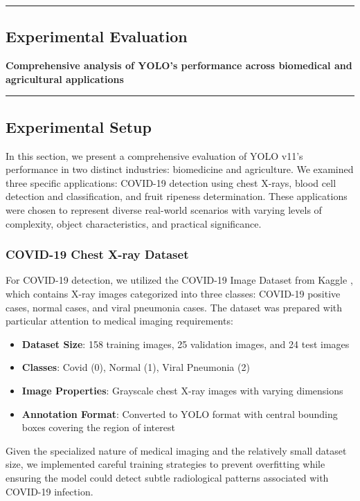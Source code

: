 {\color{gray}\hrule}
\begin{center}
\section{Experimental Evaluation}
\textbf{Comprehensive analysis of YOLO's performance across biomedical and agricultural applications}
\bigskip
\end{center}
{\color{gray}\hrule}
\begin{multicols}{2}
\subsection{Experimental Setup}

In this section, we present a comprehensive evaluation of YOLO v11's performance in two distinct industries: biomedicine and agriculture. We examined three specific applications: COVID-19 detection using chest X-rays, blood cell detection and classification, and fruit ripeness determination. These applications were chosen to represent diverse real-world scenarios with varying levels of complexity, object characteristics, and practical significance.

\subsubsection{COVID-19 Chest X-ray Dataset}

For COVID-19 detection, we utilized the COVID-19 Image Dataset from Kaggle \citep{Raikokte2020}, which contains X-ray images categorized into three classes: COVID-19 positive cases, normal cases, and viral pneumonia cases. The dataset was prepared with particular attention to medical imaging requirements:

\begin{itemize}
    \item \textbf{Dataset Size}: 158 training images, 25 validation images, and 24 test images
    \item \textbf{Classes}: Covid (0), Normal (1), Viral Pneumonia (2)
    \item \textbf{Image Properties}: Grayscale chest X-ray images with varying dimensions
    \item \textbf{Annotation Format}: Converted to YOLO format with central bounding boxes covering the region of interest
\end{itemize}

Given the specialized nature of medical imaging and the relatively small dataset size, we implemented careful training strategies to prevent overfitting while ensuring the model could detect subtle radiological patterns associated with COVID-19 infection.


\end{multicols}
